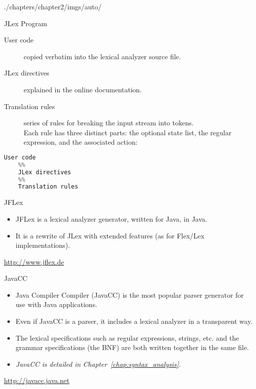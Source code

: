 \begin{graphicspathcontext}{{./chapters/chapter2/imgs/auto/}}
\begin{bibunit}[apalike]
\begin{frame}[fragile]{JLex Program}
	\begin{description}
	\item[User code] copied verbatim into the lexical analyzer source file. 
	\item[JLex directives] explained in the online documentation.
	\item[Translation rules] series of rules for breaking the input stream into tokens. \\
		Each rule has three distinct parts: the optional state list, the regular expression, and the associated action:
		\begin{center}
		\end{center}
	\end{description}
	\vfill
	\begin{lstlisting}[language=C]
	User code
	%%
	JLex directives
	%%
	Translation rules
	\end{lstlisting}
\end{frame}

\begin{frame}{JFLex}
	\begin{itemize}
	\item JFLex  is a lexical analyzer generator, written for Java, in Java.
	\vfill
	\item It is a rewrite of JLex with extended features (as for Flex/Lex implementations).
	\end{itemize}
	\vfill
	\begin{center}
	\url{http://www.jflex.de}
	\end{center}
\end{frame}

\begin{frame}{JavaCC}
	\begin{itemize}
	\item Java Compiler Compiler (JavaCC) is the most popular parser generator for use with Java applications.
	\vfill
	\item Even if JavaCC is a parser, it includes a lexical analyzer in a transparent way.
	\vfill
	\item The lexical specifications such as regular expressions, strings, etc. and the grammar specifications (the BNF) are both written together in the same file.
	\vfill
	\item \emph{JavaCC is detailed in Chapter~\ref{chap:syntax_analysis}.}
	\end{itemize}
	\vfill
	\begin{center}
	\url{http://javacc.java.net}
	\end{center}
\end{frame}


\end{bibunit}
\end{graphicspathcontext}
